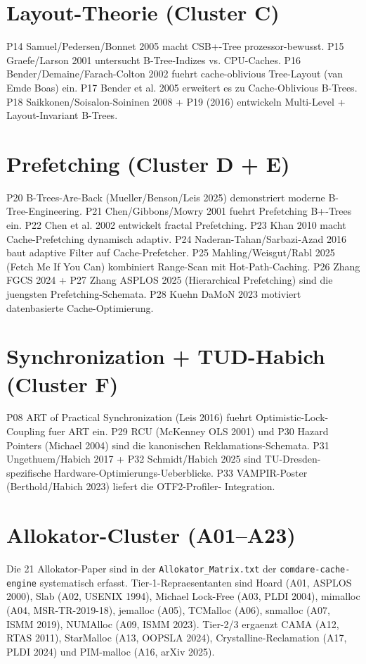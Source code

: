 \section{Layout-Theorie (Cluster C)}

P14 Samuel/Pedersen/Bonnet 2005 macht CSB+-Tree prozessor-bewusst.
P15 Graefe/Larson 2001 untersucht B-Tree-Indizes vs. CPU-Caches.
P16 Bender/Demaine/Farach-Colton 2002 fuehrt cache-oblivious
Tree-Layout (van Emde Boas) ein.
P17 Bender et al. 2005 erweitert es zu Cache-Oblivious B-Trees.
P18 Saikkonen/Soisalon-Soininen 2008 + P19 (2016) entwickeln
Multi-Level + Layout-Invariant B-Trees.

\section{Prefetching (Cluster D + E)}

P20 B-Trees-Are-Back (Mueller/Benson/Leis 2025) demonstriert moderne
B-Tree-Engineering.
P21 Chen/Gibbons/Mowry 2001 fuehrt Prefetching B+-Trees ein.
P22 Chen et al. 2002 entwickelt fractal Prefetching.
P23 Khan 2010 macht Cache-Prefetching dynamisch adaptiv.
P24 Naderan-Tahan/Sarbazi-Azad 2016 baut adaptive Filter auf
Cache-Prefetcher.
P25 Mahling/Weisgut/Rabl 2025 (Fetch Me If You Can) kombiniert
Range-Scan mit Hot-Path-Caching.
P26 Zhang FGCS 2024 + P27 Zhang ASPLOS 2025 (Hierarchical Prefetching)
sind die juengsten Prefetching-Schemata.
P28 Kuehn DaMoN 2023 motiviert datenbasierte Cache-Optimierung.

\section{Synchronization + TUD-Habich (Cluster F)}

P08 ART of Practical Synchronization (Leis 2016) fuehrt
Optimistic-Lock-Coupling fuer ART ein.
P29 RCU (McKenney OLS 2001) und P30 Hazard Pointers (Michael 2004) sind
die kanonischen Reklamations-Schemata.
P31 Ungethuem/Habich 2017 + P32 Schmidt/Habich 2025 sind
TU-Dresden-spezifische Hardware-Optimierungs-Ueberblicke.
P33 VAMPIR-Poster (Berthold/Habich 2023) liefert die OTF2-Profiler-
Integration.

\section{Allokator-Cluster (A01--A23)}

Die 21 Allokator-Paper sind in der \texttt{Allokator\_Matrix.txt} der
\texttt{comdare-cache-engine} systematisch erfasst. Tier-1-Repraesentanten
sind Hoard (A01, ASPLOS 2000), Slab (A02, USENIX 1994),
Michael Lock-Free (A03, PLDI 2004), mimalloc (A04, MSR-TR-2019-18),
jemalloc (A05), TCMalloc (A06), snmalloc (A07, ISMM 2019),
NUMAlloc (A09, ISMM 2023). Tier-2/3 ergaenzt CAMA (A12, RTAS 2011),
StarMalloc (A13, OOPSLA 2024), Crystalline-Reclamation (A17, PLDI 2024)
und PIM-malloc (A16, arXiv 2025).


